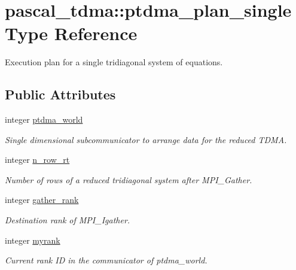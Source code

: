 \hypertarget{structpascal__tdma_1_1ptdma__plan__single}{}\section{pascal\+\_\+tdma\+::ptdma\+\_\+plan\+\_\+single Type Reference}
\label{structpascal__tdma_1_1ptdma__plan__single}


Execution plan for a single tridiagonal system of equations.  


\subsection*{Public Attributes}
\begin{DoxyCompactItemize}
\item 
integer \mbox{\hyperlink{structpascal__tdma_1_1ptdma__plan__single_a073cddefd8ef983b185b6727d8ad7de6}{ptdma\+\_\+world}}
\begin{DoxyCompactList}\small\item\em Single dimensional subcommunicator to arrange data for the reduced T\+D\+MA. \end{DoxyCompactList}\item 
integer \mbox{\hyperlink{structpascal__tdma_1_1ptdma__plan__single_a91fd8fb919f9b7d3137b13fcaa55dc1b}{n\+\_\+row\+\_\+rt}}
\begin{DoxyCompactList}\small\item\em Number of rows of a reduced tridiagonal system after M\+P\+I\+\_\+\+Gather. \end{DoxyCompactList}\item 
integer \mbox{\hyperlink{structpascal__tdma_1_1ptdma__plan__single_af0d3b3bce8b9956aa9e80ba0712a9a9d}{gather\+\_\+rank}}
\begin{DoxyCompactList}\small\item\em Destination rank of M\+P\+I\+\_\+\+Igather. \end{DoxyCompactList}\item 
integer \mbox{\hyperlink{structpascal__tdma_1_1ptdma__plan__single_af473533b36508af4e0752cee8d182334}{myrank}}
\begin{DoxyCompactList}\small\item\em Current rank ID in the communicator of ptdma\+\_\+world. \end{DoxyCompactList}\end{DoxyCompactItemize}
\textbf{ }\par
